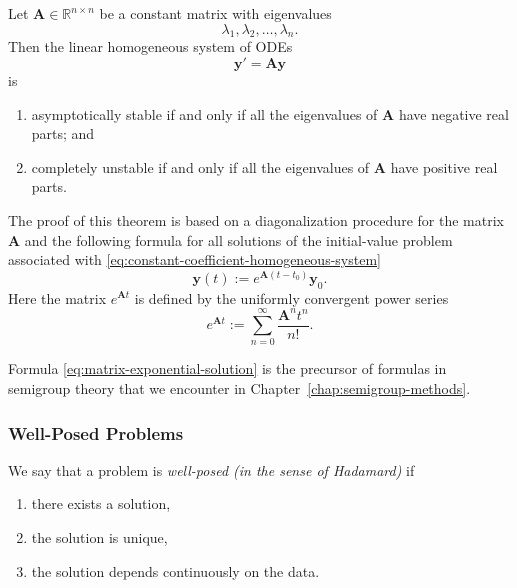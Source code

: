 \begin{Theorem}
\label{thm:constant-coefficient-stability}
Let $\bm{A}\in\mathbb{R}^{n\times n}$ be a constant matrix with eigenvalues
\[
\lambda_1,\lambda_2,\ldots,\lambda_n.
\]
Then the linear homogeneous system of ODEs
\begin{equation}\label{eq:constant-coefficient-homogeneous-system}
\bm{y}'=\bm{A}\bm{y}
\end{equation}
is
\begin{enumerate}
\item asymptotically stable if and only if all the eigenvalues of $\bm{A}$ have negative real parts; and
\item completely unstable if and only if all the eigenvalues of $\bm{A}$ have positive real parts.
\end{enumerate}
\end{Theorem}

The proof of this theorem is based on a diagonalization procedure for the matrix $\bm{A}$ and the following formula for all solutions of the initial-value problem associated with \eqref{eq:constant-coefficient-homogeneous-system}
\begin{equation}\label{eq:matrix-exponential-solution}
\bm{y}(t):=e^{\bm{A}(t-t_0)}\bm{y}_0.
\end{equation}
Here the matrix $e^{\bm{A}t}$ is defined by the uniformly convergent power series
\begin{equation}\label{eq:matrix-exponential-series}
e^{\bm{A}t}:=\sum_{n=0}^{\infty}\dfrac{\bm{A}^nt^n}{n!}.
\end{equation}


Formula \eqref{eq:matrix-exponential-solution} is the precursor of formulas in semigroup theory that we encounter in Chapter~\ref{chap:semigroup-methods}.

\subsubsection{Well-Posed Problems}\label{subsec:wellposed-problems}

We say that a problem is \emph{well-posed (in the sense of Hadamard)} if
\begin{enumerate}
\item there exists a solution,
\item the solution is unique,
\item the solution depends continuously on the data.
\end{enumerate}

